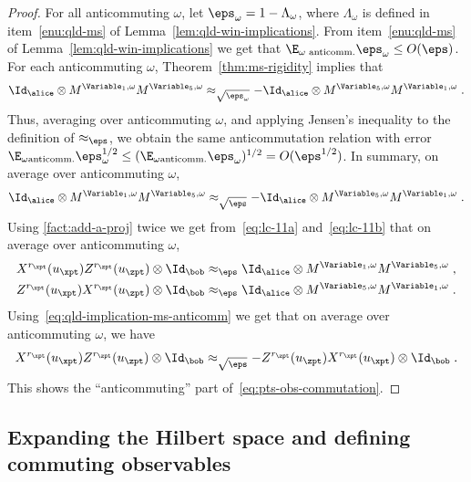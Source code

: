 \begin{proof}
For all anticommuting $\omega$, let $\eps_\omega = 1 -
\Lambda_\omega$, where $\Lambda_\omega$ is defined in
item~\ref{enu:qld-ms} of Lemma~\ref{lem:qld-win-implications}. From
item~\ref{enu:qld-ms} of Lemma~\ref{lem:qld-win-implications} we get
that $\E_{\omega \text{ anticomm.}} \eps_\omega \leq
O(\eps)$. For each anticommuting $\omega$,
Theorem~\ref{thm:ms-rigidity} implies that
\[ \Id_\alice \otimes M^{\Variable_1,\omega} M^{\Variable_5,\omega}
  \approx_{\sqrt{\eps_\omega}} -\Id_\alice \otimes M^{\Variable_5,\omega}
  M^{\Variable_1,\omega}\;. \]
Thus, averaging over anticommuting $\omega$, and applying Jensen's
inequality to the definition of $\approx_{\eps}$, we obtain the same
anticommutation relation with error $ \E_{\omega \text{anticomm.}}
\eps_{\omega}^{1/2} \leq (\E_{\omega \text{anticomm.}}
\eps_\omega)^{1/2} = O(\eps^{1/2})$. In summary, on average over anticommuting $\omega$, 
\begin{equation}
\label{eq:qld-implication-ms-anticomm}
\Id_\alice \otimes M^{\Variable_1,\omega} M^{\Variable_5,\omega} \approx_{\sqrt{\eps}} -\Id_\alice \otimes M^{\Variable_5,\omega} M^{\Variable_1,\omega}\;.
\end{equation}
Using \ref{fact:add-a-proj} twice we get from~\eqref{eq:lc-11a} and~\eqref{eq:lc-11b} that on average over anticommuting $\omega$,
\begin{gather}
	X^{r_\xpt}(u_\xpt) Z^{r_\zpt}(u_\zpt) \otimes \Id_\bob \approx_\eps \Id_\alice \otimes M^{\Variable_1,\omega}  M^{\Variable_5,\omega}\;, \\
	Z^{r_\xpt}(u_\xpt) X^{r_\zpt}(u_\zpt) \otimes \Id_\bob \approx_\eps \Id_\alice \otimes M^{\Variable_5,\omega}  M^{\Variable_1,\omega}\;.
\end{gather}
Using~\eqref{eq:qld-implication-ms-anticomm} we get that on average over anticommuting $\omega$, we have
\[
X^{r_\xpt}(u_\xpt) Z^{r_\zpt}(u_\zpt) \otimes \Id_\bob \approx_{\sqrt{\eps}} - Z^{r_\zpt}(u_\zpt)X^{r_\xpt}(u_\xpt)  \otimes \Id_\bob\;.
\]
This shows the ``anticommuting'' part of~\eqref{eq:pts-obs-commutation}.
\end{proof}

\subsection{Expanding the Hilbert space and defining commuting observables}
\label{sec:expanding}

